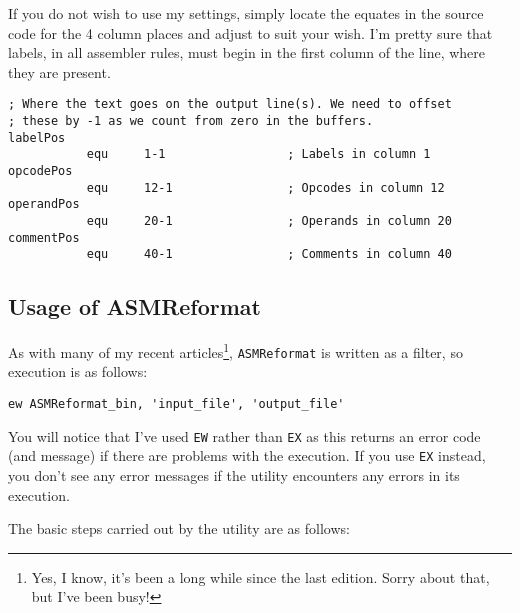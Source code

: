 If you do not wish to use my settings, simply locate the equates in the source code for the 4 column places and adjust to suit your wish. I'm pretty sure that labels, in all assembler rules, must begin in the first column of the line, where they are present.

\begin{lstlisting}[firstnumber=62,caption={Configuration of Column Positions}]
; Where the text goes on the output line(s). We need to offset
; these by -1 as we count from zero in the buffers.
labelPos
           equ     1-1                 ; Labels in column 1
opcodePos
           equ     12-1                ; Opcodes in column 12
operandPos
           equ     20-1                ; Operands in column 20
commentPos
           equ     40-1                ; Comments in column 40
\end{lstlisting}


\subsection{Usage of ASMReformat}
As with many of my recent articles\footnote{Yes, I know, it's been a long while since the last edition. Sorry about that, but I've been busy!}, \texttt{ASMReformat} is written as a filter, so execution is as follows:

\begin{lstlisting}[numbers=none,caption={Executing ASMReformat}]
ew ASMReformat_bin, 'input_file', 'output_file'
\end{lstlisting}

You will notice that I've used \texttt{EW} rather than \texttt{EX} as this returns an error code (and message) if there are problems with the execution. If you use \texttt{EX} instead, you don't see any error messages if the utility encounters any errors in its execution.

The basic steps carried out by the utility are as follows:

